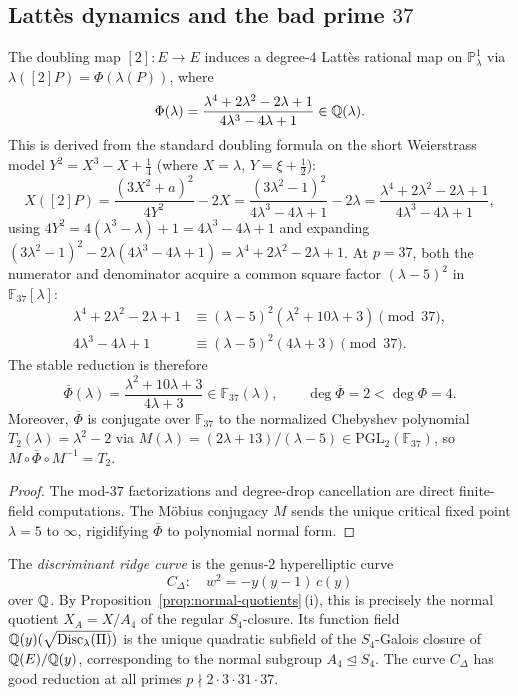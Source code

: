 \subsection{Latt\`es dynamics and the bad prime \texorpdfstring{$37$}{37}}

\begin{proposition}[Doubling Latt\`es map and stable reduction at $p=37$]\label{prop:lattes-37}
The doubling map $[2]:E\to E$ induces a degree-$4$ Latt\`es rational map on $\mathbb{P}^1_\lambda$ via $\lambda([2]P)=\Phi(\lambda(P))$, where
\[
\Phi(\lambda)=\frac{\lambda^4+2\lambda^2-2\lambda+1}{4\lambda^3-4\lambda+1}\in\mathbb{Q}(\lambda).
\]
This is derived from the standard doubling formula on the short Weierstrass model $Y^2=X^3-X+\tfrac{1}{4}$ (where $X=\lambda$, $Y=\xi+\tfrac{1}{2}$):
\[
X([2]P)=\frac{(3X^2+a)^2}{4Y^2}-2X=\frac{(3\lambda^2-1)^2}{4\lambda^3-4\lambda+1}-2\lambda=\frac{\lambda^4+2\lambda^2-2\lambda+1}{4\lambda^3-4\lambda+1},
\]
using $4Y^2=4(\lambda^3-\lambda)+1=4\lambda^3-4\lambda+1$ and expanding $(3\lambda^2-1)^2-2\lambda(4\lambda^3-4\lambda+1)=\lambda^4+2\lambda^2-2\lambda+1$.
At $p=37$, both the numerator and denominator acquire a common square factor $(\lambda-5)^2$ in $\mathbb{F}_{37}[\lambda]$:
\begin{align*}
\lambda^4+2\lambda^2-2\lambda+1&\equiv(\lambda-5)^2(\lambda^2+10\lambda+3)\pmod{37},\\
4\lambda^3-4\lambda+1&\equiv(\lambda-5)^2(4\lambda+3)\pmod{37}.
\end{align*}
The stable reduction is therefore
\[
\overline{\Phi}(\lambda)=\frac{\lambda^2+10\lambda+3}{4\lambda+3}\in\mathbb{F}_{37}(\lambda),\qquad \deg\overline{\Phi}=2<\deg\Phi=4.
\]
Moreover, $\overline{\Phi}$ is conjugate over $\mathbb{F}_{37}$ to the normalized Chebyshev polynomial $T_2(\lambda)=\lambda^2-2$ via $M(\lambda)=(2\lambda+13)/(\lambda-5)\in\mathrm{PGL}_2(\mathbb{F}_{37})$, so $M\circ\overline{\Phi}\circ M^{-1}=T_2$.
\end{proposition}

\begin{proof}
The mod-$37$ factorizations and degree-drop cancellation are direct finite-field computations.
The M\"obius conjugacy $M$ sends the unique critical fixed point $\lambda=5$ to $\infty$, rigidifying $\overline{\Phi}$ to polynomial normal form.
\end{proof}

\begin{definition}\label{def:disc-ridge}
The \emph{discriminant ridge curve} is the genus-$2$ hyperelliptic curve
\[
C_\Delta:\quad w^2=-y(y-1)\,c(y)
\]
over $\mathbb{Q}$.
By Proposition~\ref{prop:normal-quotients}\,(i), this is precisely the normal quotient \(X_A=X/A_4\) of the regular \(S_4\)-closure.
Its function field $\mathbb{Q}(y)(\sqrt{\operatorname{Disc}_\lambda(\Pi)})$ is the unique quadratic subfield of the $S_4$-Galois closure of $\mathbb{Q}(E)/\mathbb{Q}(y)$, corresponding to the normal subgroup $A_4\trianglelefteq S_4$.
The curve $C_\Delta$ has good reduction at all primes $p\nmid 2\cdot 3\cdot 31\cdot 37$.
\end{definition}

